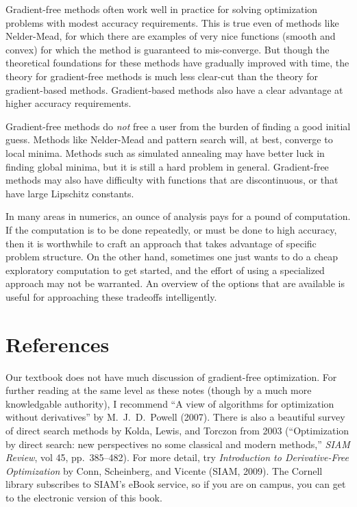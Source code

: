 \documentclass[12pt, leqno]{article} %
\begin{document}
Gradient-free methods often work well in practice for solving
optimization problems with modest accuracy requirements.  This is true
even of methods like Nelder-Mead, for which there are examples of very
nice functions (smooth and convex) for which the method is guaranteed
to mis-converge.  But though the theoretical foundations for these
methods have gradually improved with time, the theory for
gradient-free methods is much less clear-cut than the theory for
gradient-based methods.  Gradient-based methods also have a clear
advantage at higher accuracy requirements.

Gradient-free methods do {\em not} free a user from the burden of
finding a good initial guess.  Methods like Nelder-Mead and pattern
search will, at best, converge to local minima.  Methods such as
simulated annealing may have better luck in finding global minima,
but it is still a hard problem in general.  Gradient-free methods may
also have difficulty with functions that are discontinuous, or that
have large Lipschitz constants.

In many areas in numerics, an ounce of analysis pays for a pound of
computation.  If the computation is to be done repeatedly, or must be
done to high accuracy, then it is worthwhile to craft an approach that
takes advantage of specific problem structure.  On the other hand,
sometimes one just wants to do a cheap exploratory computation to
get started, and the effort of using a specialized approach may not
be warranted.  An overview of the options that are available is
useful for approaching these tradeoffs intelligently.

\section{References}

Our textbook does not have much discussion of gradient-free
optimization.  For further reading at the same level as these notes
(though by a much more knowledgable authority), I recommend ``A view
of algorithms for optimization without derivatives'' by
M.~J.~D.~Powell (2007).  There is also a beautiful survey of direct
search methods by Kolda, Lewis, and Torczon from 2003 (``Optimization
by direct search: new perspectives no some classical and modern
methods,'' {\em SIAM Review}, vol 45, pp.~385--482).
For more detail, try {\em Introduction to
  Derivative-Free Optimization} by Conn, Scheinberg, and Vicente
(SIAM, 2009).  The Cornell library subscribes to SIAM's eBook service,
so if you are on campus, you can get to the electronic version of this
book.
\end{document}
